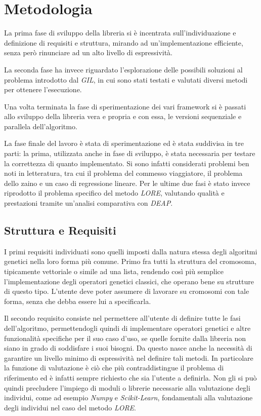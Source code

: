 \chapter{Metodologia}\label{cap: methods}

La prima fase di sviluppo della libreria si è incentrata sull'individuazione
e definizione di requisiti e struttura, mirando ad un'implementazione
efficiente, senza però rinunciare ad un alto livello di espressività.

La seconda fase ha invece riguardato l'esplorazione delle possibili soluzioni
al problema introdotto dal \textit{GIL}, in cui sono stati testati e valutati
diversi metodi per ottenere l'esecuzione.

Una volta terminata la fase di sperimentazione dei vari framework si è passati
allo sviluppo della libreria vera e propria e con essa, le versioni sequenziale
e parallela dell'algoritmo.

La fase finale del lavoro è stata di sperimentazione ed è stata suddivisa in
tre parti: la prima, utilizzata anche in fase di sviluppo, è stata necessaria
per testare la correttezza di quanto implementato. Si sono infatti considerati
problemi ben noti in letteratura, tra cui il problema del commesso viaggiatore,
il problema dello zaino e un caso di regressione lineare. Per le ultime due
fasi è stato invece riprodotto il problema specifico del metodo \textit{LORE},
valutando qualità e prestazioni tramite un'analisi comparativa con \textit{DEAP}.

\section{Struttura e Requisiti}

I primi requisiti individuati sono quelli imposti dalla natura stessa degli
algoritmi genetici nella loro forma più comune. Primo fra tutti la struttura
del cromosoma, tipicamente vettoriale o simile ad una lista, rendendo così più
semplice l'implementazione degli operatori genetici classici, che operano bene
su strutture di questo tipo. L'utente deve poter assumere di lavorare su
cromosomi con tale forma, senza che debba essere lui a specificarla.

Il secondo requisito consiste nel permettere all'utente di definire tutte le
fasi dell'algoritmo, permettendogli quindi di implementare operatori genetici e
altre funzionalità specifiche per il suo caso d'uso, se quelle fornite
dalla libreria non siano in grado di soddisfare i suoi bisogni. Da questo
nasce anche la necessità di garantire un livello minimo di espressività nel
definire tali metodi. In particolare la funzione di valutazione è ciò che più
contraddistingue il problema di riferimento ed è infatti sempre richiesto che
sia l'utente a definirla. Non gli si può quindi precludere l'impiego di moduli
o librerie necessarie alla valutazione degli individui, come ad esempio
\textit{Numpy} e \textit{Scikit-Learn}, fondamentali alla valutazione degli
individui nel caso del metodo \textit{LORE}.

